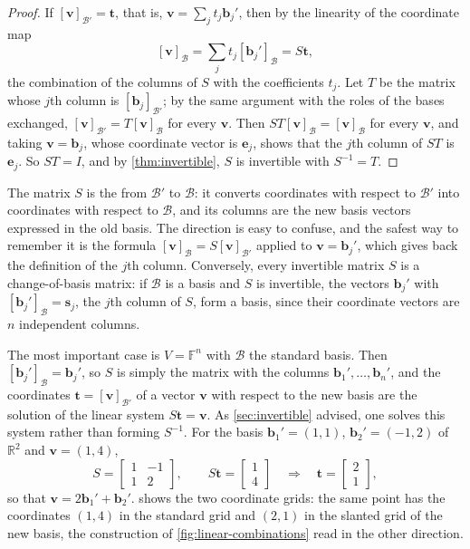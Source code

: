 \begin{proof}
If $[\mathbf v]_{\mathcal B'}=\mathbf t$, that is, $\mathbf v=\sum_jt_j\mathbf b_j'$, then by the linearity of the coordinate map
\[
[\mathbf v]_{\mathcal B}=\sum_jt_j[\mathbf b_j']_{\mathcal B}=S\mathbf t,
\]
the combination of the columns of $S$ with the coefficients $t_j$. Let $T$ be the matrix whose $j$th column is $[\mathbf b_j]_{\mathcal B'}$; by the same argument with the roles of the bases exchanged, $[\mathbf v]_{\mathcal B'}=T[\mathbf v]_{\mathcal B}$ for every $\mathbf v$. Then $ST[\mathbf v]_{\mathcal B}=[\mathbf v]_{\mathcal B}$ for every $\mathbf v$, and taking $\mathbf v=\mathbf b_j$, whose coordinate vector is $\mathbf e_j$, shows that the $j$th column of $ST$ is $\mathbf e_j$. So $ST=I$, and by \cref{thm:invertible}, $S$ is invertible with $S^{-1}=T$.
\end{proof}

The matrix $S$ is the  from $\mathcal B'$ to $\mathcal B$: it converts coordinates with respect to $\mathcal B'$ into coordinates with respect to $\mathcal B$, and its columns are the new basis vectors expressed in the old basis. The direction is easy to confuse, and the safest way to remember it is the formula $[\mathbf v]_{\mathcal B}=S[\mathbf v]_{\mathcal B'}$ applied to $\mathbf v=\mathbf b_j'$, which gives back the definition of the $j$th column. Conversely, every invertible matrix $S$ is a change-of-basis matrix: if $\mathcal B$ is a basis and $S$ is invertible, the vectors $\mathbf b_j'$ with $[\mathbf b_j']_{\mathcal B}=\mathbf s_j$, the $j$th column of $S$, form a basis, since their coordinate vectors are $n$ independent columns.

The most important case is $V=\mathbb F^n$ with $\mathcal B$ the standard basis. Then $[\mathbf b_j']_{\mathcal B}=\mathbf b_j'$, so $S$ is simply the matrix with the columns $\mathbf b_1',\ldots,\mathbf b_n'$, and the coordinates $\mathbf t=[\mathbf v]_{\mathcal B'}$ of a vector $\mathbf v$ with respect to the new basis are the solution of the linear system $S\mathbf t=\mathbf v$. As \cref{sec:invertible} advised, one solves this system rather than forming $S^{-1}$. For the basis $\mathbf b_1'=(1,1)$, $\mathbf b_2'=(-1,2)$ of $\mathbb R^2$ and $\mathbf v=(1,4)$,
\[
S=\begin{bmatrix}1&-1\\1&2\end{bmatrix},\qquad S\mathbf t=\begin{bmatrix}1\\4\end{bmatrix}\quad\Longrightarrow\quad\mathbf t=\begin{bmatrix}2\\1\end{bmatrix},
\]
so that $\mathbf v=2\mathbf b_1'+\mathbf b_2'$.  shows the two coordinate grids: the same point has the coordinates $(1,4)$ in the standard grid and $(2,1)$ in the slanted grid of the new basis, the construction of \cref{fig:linear-combinations} read in the other direction.

